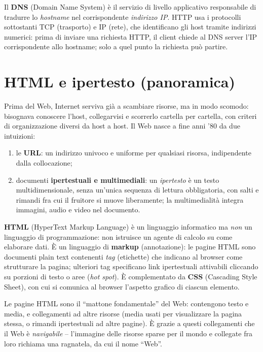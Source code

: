 \begin{definizione}[DNS]
Il \textbf{DNS} (Domain Name System) \`e il servizio di livello applicativo responsabile di
tradurre lo \emph{hostname} nel corrispondente \emph{indirizzo IP}. HTTP usa i protocolli
sottostanti TCP (trasporto) e IP (rete), che identificano gli host tramite indirizzi numerici:
prima di inviare una richiesta HTTP, il client chiede al DNS server l'IP corrispondente allo
hostname; solo a quel punto la richiesta pu\`o partire.
\end{definizione}

\section{HTML e ipertesto (panoramica)}

Prima del Web, Internet serviva gi\`a a scambiare risorse, ma in modo scomodo: bisognava
conoscere l'host, collegarvisi e scorrerlo cartella per cartella, con criteri di organizzazione
diversi da host a host. Il Web nasce a fine anni '80 da due intuizioni:
\begin{enumerate}
  \item le \textbf{URL}: un indirizzo univoco e uniforme per qualsiasi risorsa, indipendente
        dalla collocazione;
  \item documenti \textbf{ipertestuali e multimediali}: un \emph{ipertesto} \`e un testo
        multidimensionale, senza un'unica sequenza di lettura obbligatoria, con salti e rimandi
        fra cui il fruitore si muove liberamente; la multimedialit\`a integra immagini, audio e
        video nel documento.
\end{enumerate}

\begin{definizione}[HTML]
\textbf{HTML} (HyperText Markup Language) \`e un linguaggio informatico ma \emph{non} un
linguaggio di programmazione: non istruisce un agente di calcolo su come elaborare dati.
\`E un linguaggio di \textbf{markup} (annotazione): le pagine HTML sono documenti plain text
contenenti \emph{tag} (etichette) che indicano al browser come strutturare la pagina; ulteriori
tag specificano link ipertestuali attivabili cliccando su porzioni di testo o aree
(\emph{hot spot}). \`E complementato da \textbf{CSS} (Cascading Style Sheet), con cui si comunica
al browser l'aspetto grafico di ciascun elemento.
\end{definizione}

Le pagine HTML sono il ``mattone fondamentale'' del Web: contengono testo e media, e
collegamenti ad altre risorse (media usati per visualizzare la pagina stessa, o rimandi
ipertestuali ad altre pagine). \`E grazie a questi collegamenti che il Web \`e \emph{navigabile}
-- l'immagine delle risorse sparse per il mondo e collegate fra loro richiama una ragnatela,
da cui il nome ``Web''.

